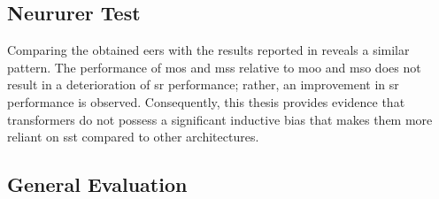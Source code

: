 



\subsection{Neururer Test}


Comparing the obtained \glspl{eer} with the results reported in \cite{neururer2023deep} reveals a similar pattern. The performance of \gls{mos} and \gls{mss} relative to \gls{moo} and \gls{mso} does not result in a deterioration of \gls{sr} performance; rather, an improvement in \gls{sr} performance is observed. Consequently, this thesis provides evidence that transformers do not possess a significant inductive bias that makes them more reliant on \gls{sst} compared to other architectures.



\subsection{General Evaluation}


